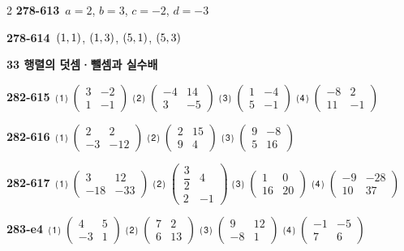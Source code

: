 \documentclass[10pt,a4paper]{article}
\begin{document}
\begin{multicols}{2}
\noindent\textbf{278-613}\ $a=2$, $b=3$, $c=-2$, $d=-3$\par
\noindent\textbf{278-614}\ $(1{,}\mkern3mu\mathopen{}1)$, $(1{,}\mkern3mu\mathopen{}3)$, $(5{,}\mkern3mu\mathopen{}1)$, $(5{,}\mkern3mu\mathopen{}3)$\par
\noindent\textbf{33 행렬의 덧셈·뺄셈과 실수배}\par\smallskip
\noindent\textbf{282-615}\ ⑴ $\begin{pmatrix} 3 & -2 \\ 1 & -1 \end{pmatrix}$ ⑵ $\begin{pmatrix} -4 & 14 \\ 3 & -5 \end{pmatrix}$ ⑶ $\begin{pmatrix} 1 & -4 \\ 5 & -1 \end{pmatrix}$ ⑷ $\begin{pmatrix} -8 & 2 \\ 11 & -1 \end{pmatrix}$\par
\noindent\textbf{282-616}\ ⑴ $\begin{pmatrix} 2 & 2 \\ -3 & -12 \end{pmatrix}$ ⑵ $\begin{pmatrix} 2 & 15 \\ 9 & 4 \end{pmatrix}$ ⑶ $\begin{pmatrix} 9 & -8 \\ 5 & 16 \end{pmatrix}$\par
\noindent\textbf{282-617}\ ⑴ $\begin{pmatrix} 3 & 12 \\ -18 & -33 \end{pmatrix}$ ⑵ $\begin{pmatrix} \dfrac{3}{2} & 4 \\ 2 & -1 \end{pmatrix}$ ⑶ $\begin{pmatrix} 1 & 0 \\ 16 & 20 \end{pmatrix}$ ⑷ $\begin{pmatrix} -9 & -28 \\ 10 & 37 \end{pmatrix}$\par
\noindent\textbf{283-e4}\ ⑴ $\begin{pmatrix} 4 & 5 \\ -3 & 1 \end{pmatrix}$ ⑵ $\begin{pmatrix} 7 & 2 \\ 6 & 13 \end{pmatrix}$ ⑶ $\begin{pmatrix} 9 & 12 \\ -8 & 1 \end{pmatrix}$ ⑷ $\begin{pmatrix} -1 & -5 \\ 7 & 6 \end{pmatrix}$\par

\end{multicols}
\end{document}
